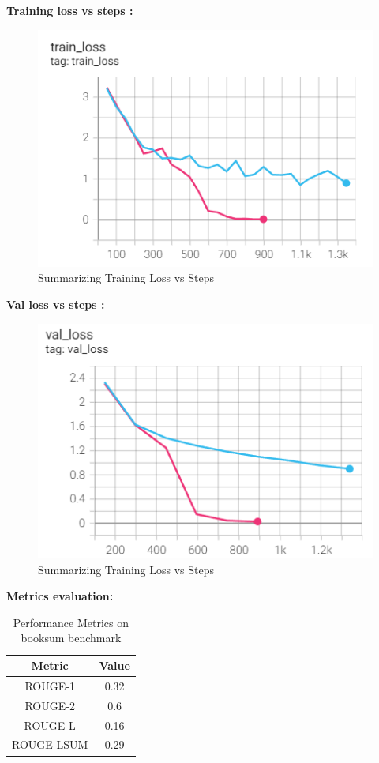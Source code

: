\newpage

\hfill \break
\textbf{Training loss vs steps :}

\begin{figure}[h!]
	\centering
	\includegraphics[scale=0.8]{figures/Summarization Training Loss vs Steps.png.png}
	\caption{ Summarizing Training Loss vs Steps }
\end{figure}

\hfill \break
\textbf{Val loss vs steps :}

\begin{figure}[h!]
	\centering
	\includegraphics[scale=0.8]{figures/Summarization Val Loss vs Steps.png.png}
	\caption{ Summarizing Training Loss vs Steps }
\end{figure}

\newpage
\hfill \break
\textbf{Metrics evaluation:} 

\begin{table}[h!]
    \centering
    \begin{tabular}{|c|c|}
        \hline
        \textbf{Metric} & \textbf{Value} \\
        \hline
        ROUGE-1 & 0.32\\
        \hline
        ROUGE-2 & 0.6 \\
        \hline
        ROUGE-L & 0.16 \\
        \hline
        ROUGE-LSUM & 0.29 \\
        \hline
    \end{tabular}
    \caption{Performance Metrics on booksum benchmark}
    \label{tab:performance_metrics}
\end{table}

